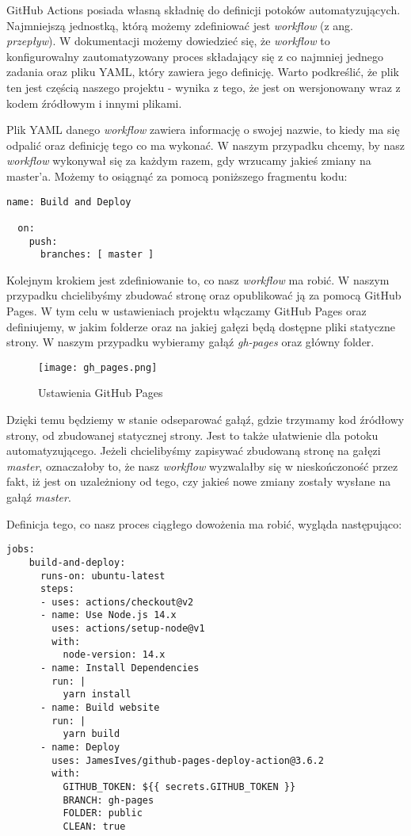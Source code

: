 \par
GitHub Actions posiada własną składnię do definicji potoków automatyzujących. Najmniejszą jednostką, którą możemy zdefiniować jest \textit{workflow} (z ang. \textit{przepływ}). W dokumentacji \cite{GithubActionsDoc} możemy dowiedzieć się, że \textit{workflow} to konfigurowalny zautomatyzowany proces składający się z co najmniej jednego zadania oraz pliku YAML, który zawiera jego definicję. Warto podkreślić, że plik ten jest częścią naszego projektu - wynika z tego, że jest on wersjonowany wraz z kodem źródłowym i innymi plikami.
\par
Plik YAML danego \textit{workflow} zawiera informację o swojej nazwie, to kiedy ma się odpalić oraz definicję tego co ma wykonać. W naszym przypadku chcemy, by nasz \textit{workflow} wykonywał się za każdym razem, gdy wrzucamy jakieś zmiany na master'a. Możemy to osiągnąć za pomocą poniższego fragmentu kodu:
\begin{lstlisting}[caption={Nazwa oraz definicja wyzwalacza \textit{workflow} budującęgo stronę}]
  name: Build and Deploy

  on:
    push:
      branches: [ master ]
\end{lstlisting}
\par
Kolejnym krokiem jest zdefiniowanie to, co nasz \textit{workflow} ma robić. W naszym przypadku chcielibyśmy zbudować stronę oraz opublikować ją za pomocą GitHub Pages. W tym celu w ustawieniach projektu włączamy GitHub Pages oraz definiujemy, w jakim folderze oraz na jakiej gałęzi będą dostępne pliki statyczne strony. W naszym przypadku wybieramy gałąź \textit{gh-pages} oraz główny folder.
\begin{figure}[htbp]
  \centering
  \texttt{[image: gh\_pages.png]}
  \caption{Ustawienia GitHub Pages}
  \label{fig:gh_pages}
\end{figure}
Dzięki temu będziemy w stanie odseparować gałąź, gdzie trzymamy kod źródłowy strony, od zbudowanej statycznej strony. Jest to także ułatwienie dla potoku automatyzującego. Jeżeli chcielibyśmy zapisywać zbudowaną stronę na gałęzi \textit{master}, oznaczałoby to, że nasz \textit{workflow} wyzwalałby się w nieskończoność przez fakt, iż jest on uzależniony od tego, czy jakieś nowe zmiany zostały wysłane na gałąź \textit{master}.
\par
Definicja tego, co nasz proces ciągłego dowożenia ma robić, wygląda następująco:
\begin{lstlisting}[caption={Definicja zadań \textit{workflow}'a budującego stronę}]
  jobs:
    build-and-deploy:
      runs-on: ubuntu-latest
      steps:
      - uses: actions/checkout@v2
      - name: Use Node.js 14.x
        uses: actions/setup-node@v1
        with:
          node-version: 14.x
      - name: Install Dependencies
        run: |
          yarn install
      - name: Build website
        run: |
          yarn build
      - name: Deploy
        uses: JamesIves/github-pages-deploy-action@3.6.2
        with:
          GITHUB_TOKEN: ${{ secrets.GITHUB_TOKEN }}
          BRANCH: gh-pages
          FOLDER: public
          CLEAN: true
\end{lstlisting}
